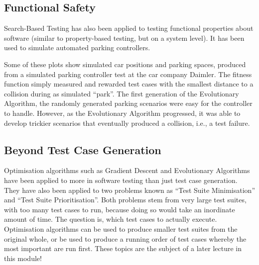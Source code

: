 \subsection{Functional Safety}

Search-Based Testing has also been applied to testing functional properties
about software (similar to property-based testing, but on a system level). It
has been used to simulate automated parking controllers. 

Some of these plots show simulated car positions and parking spaces, produced
from a simulated parking controller test at the car company Daimler. The fitness
function simply measured and rewarded test cases with the smallest distance to a
collision during as simulated ``park''. The first generation of the Evolutionary
Algorithm, the randomly generated parking scenarios were easy for the controller
to handle. However, as the Evolutionary Algorithm progressed, it was able to
develop trickier scenarios that eventually produced a collision, i.e., a test
failure.


\subsection{Beyond Test Case Generation}

Optimisation algorithms such as Gradient Descent and Evolutionary Algorithms
have been applied to more in software testing than just test case generation.
They have also been applied to two problems known as ``Test Suite Minimisation''
and ``Test Suite Prioritisation''. Both problems stem from very large test
suites, with too many test cases to run, because doing so would take an
inordinate amount of time. The question is, which test cases to actually
execute. Optimisation algorithms can be used to produce smaller test suites from
the original whole, or be used to produce a running order of test cases whereby
the most important are run first. These topics are the subject of a later
lecture in this module!

